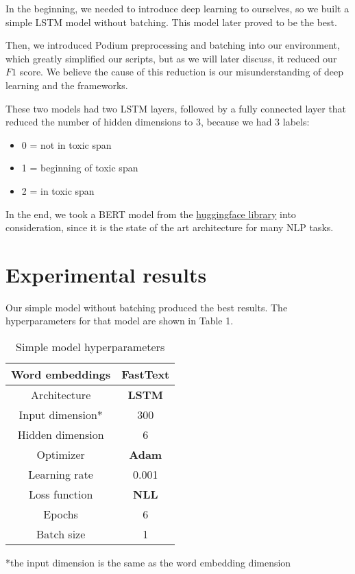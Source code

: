 \documentclass{article}
\begin{document}
In the beginning, we needed to introduce deep learning to ourselves, so we built a simple LSTM model without batching. This model later proved to be the best. 

Then, we introduced Podium preprocessing and batching into our environment, which greatly simplified our scripts, but as we will later discuss, it reduced our $F1$ score. We believe the cause of this reduction is our misunderstanding of deep learning and the frameworks. 

These two models had two LSTM layers, followed by a fully connected layer that reduced the number of hidden dimensions to 3, because we had 3 labels:
\begin{itemize}
	\item 0 = not in toxic span
	\item 1 = beginning of toxic span
	\item 2 = in toxic span
\end{itemize}

In the end, we took a BERT model from the \href{https://huggingface.co/}{huggingface library} into consideration, since it is the state of the art architecture for many NLP tasks.  

\section{Experimental results}
Our simple model without batching produced the best results. The hyperparameters for that model are shown in Table 1.

\begin{table}[h!]
	\begin{center}
		\caption{Simple model hyperparameters}
		\begin{tabular}{| c | c |}
			\hline
			Word embeddings & \textbf{FastText} \\
			\hline
			Architecture & \textbf{LSTM}\\
			\hline
			Input dimension* & 300 \\
			\hline
			Hidden dimension & 6 \\
			\hline
			Optimizer & \textbf{Adam} \\
			\hline
		    Learning rate & 0.001 \\
		    \hline
		    Loss function & \textbf{NLL} \\
		    \hline
		    Epochs & 6 \\
		    \hline
		    Batch size & 1 \\
		    \hline
		\end{tabular}
		
	\end{center}
	\label{tab:hyper1}
\end{table}
\begin{center}
	*the input dimension is the same as the word embedding dimension
\end{center}
\end{document}
